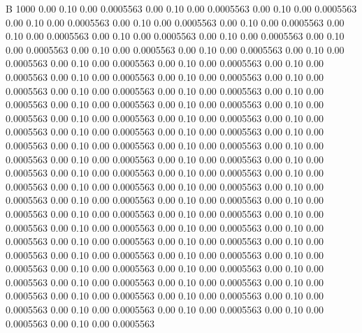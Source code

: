 


B 1000
   0.00    0.10    0.00   0.0005563
   0.00    0.10    0.00   0.0005563
   0.00    0.10    0.00   0.0005563
   0.00    0.10    0.00   0.0005563
   0.00    0.10    0.00   0.0005563
   0.00    0.10    0.00   0.0005563
   0.00    0.10    0.00   0.0005563
   0.00    0.10    0.00   0.0005563
   0.00    0.10    0.00   0.0005563
   0.00    0.10    0.00   0.0005563
   0.00    0.10    0.00   0.0005563
   0.00    0.10    0.00   0.0005563
   0.00    0.10    0.00   0.0005563
   0.00    0.10    0.00   0.0005563
   0.00    0.10    0.00   0.0005563
   0.00    0.10    0.00   0.0005563
   0.00    0.10    0.00   0.0005563
   0.00    0.10    0.00   0.0005563
   0.00    0.10    0.00   0.0005563
   0.00    0.10    0.00   0.0005563
   0.00    0.10    0.00   0.0005563
   0.00    0.10    0.00   0.0005563
   0.00    0.10    0.00   0.0005563
   0.00    0.10    0.00   0.0005563
   0.00    0.10    0.00   0.0005563
   0.00    0.10    0.00   0.0005563
   0.00    0.10    0.00   0.0005563
   0.00    0.10    0.00   0.0005563
   0.00    0.10    0.00   0.0005563
   0.00    0.10    0.00   0.0005563
   0.00    0.10    0.00   0.0005563
   0.00    0.10    0.00   0.0005563
   0.00    0.10    0.00   0.0005563
   0.00    0.10    0.00   0.0005563
   0.00    0.10    0.00   0.0005563
   0.00    0.10    0.00   0.0005563
   0.00    0.10    0.00   0.0005563
   0.00    0.10    0.00   0.0005563
   0.00    0.10    0.00   0.0005563
   0.00    0.10    0.00   0.0005563
   0.00    0.10    0.00   0.0005563
   0.00    0.10    0.00   0.0005563
   0.00    0.10    0.00   0.0005563
   0.00    0.10    0.00   0.0005563
   0.00    0.10    0.00   0.0005563
   0.00    0.10    0.00   0.0005563
   0.00    0.10    0.00   0.0005563
   0.00    0.10    0.00   0.0005563
   0.00    0.10    0.00   0.0005563
   0.00    0.10    0.00   0.0005563
   0.00    0.10    0.00   0.0005563
   0.00    0.10    0.00   0.0005563
   0.00    0.10    0.00   0.0005563
   0.00    0.10    0.00   0.0005563
   0.00    0.10    0.00   0.0005563
   0.00    0.10    0.00   0.0005563
   0.00    0.10    0.00   0.0005563
   0.00    0.10    0.00   0.0005563
   0.00    0.10    0.00   0.0005563
   0.00    0.10    0.00   0.0005563
   0.00    0.10    0.00   0.0005563
   0.00    0.10    0.00   0.0005563
   0.00    0.10    0.00   0.0005563
   0.00    0.10    0.00   0.0005563
   0.00    0.10    0.00   0.0005563
   0.00    0.10    0.00   0.0005563
   0.00    0.10    0.00   0.0005563
   0.00    0.10    0.00   0.0005563
   0.00    0.10    0.00   0.0005563
   0.00    0.10    0.00   0.0005563
   0.00    0.10    0.00   0.0005563
